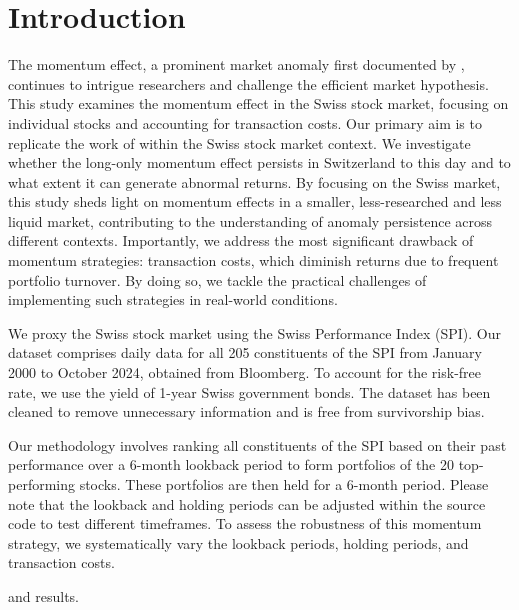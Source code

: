 \documentclass[a4paper,12pt]{article}
\begin{document}
    \setcounter{page}{1}
    \tableofcontents
    
    \clearpage
    \listoftables
    \listoffigures
    \clearpage
    
    \setcounter{page}{1}
    \section{Introduction}
    The momentum effect, a prominent market anomaly first documented by \cite{jegatit1993}, continues to intrigue researchers and challenge the efficient market hypothesis. This study examines the momentum effect in the Swiss stock market, focusing on individual stocks and accounting for transaction costs. Our primary aim is to replicate the work of \cite{jegatit1993} within the Swiss stock market context. We investigate whether the long-only momentum effect persists in Switzerland to this day and to what extent it can generate abnormal returns. By focusing on the Swiss market, this study sheds light on momentum effects in a smaller, less-researched and less liquid market, contributing to the understanding of anomaly persistence across different contexts. Importantly, we address the most significant drawback of momentum strategies: transaction costs, which diminish returns due to frequent portfolio turnover. By doing so, we tackle the practical challenges of implementing such strategies in real-world conditions. 
    
    We proxy the Swiss stock market using the Swiss Performance Index (SPI). Our dataset comprises daily data for all 205 constituents of the SPI from January 2000 to October 2024, obtained from Bloomberg. To account for the risk-free rate, we use the yield of 1-year Swiss government bonds. The dataset has been cleaned to remove unnecessary information and is free from survivorship bias. 
    
    Our methodology involves ranking all constituents of the SPI based on their past performance over a 6-month lookback period to form portfolios of the 20 top-performing stocks. These portfolios are then held for a 6-month period. Please note that the lookback and holding periods can be adjusted within the source code to test different timeframes. To assess the robustness of this momentum strategy, we systematically vary the lookback periods, holding periods, and transaction costs.  
    
    and results. 
    
\end{document}
